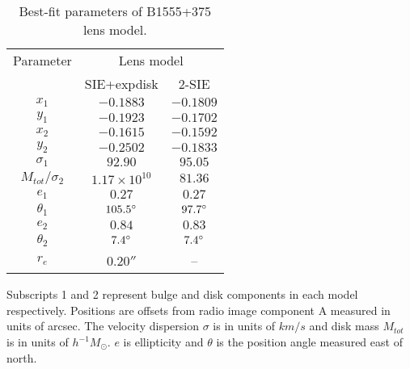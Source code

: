 \documentclass[useAMS,usenatbib]{mn2e}
\begin{document}
\begin{table}
  \caption{Best-fit parameters of B1555+375 lens model.}
  \begin{tabular}{@{}ccc}
\hline 
 Parameter  & \multicolumn{2}{c}{Lens model} \\
		&SIE+expdisk& 2-SIE		   
\\
\hline
$x_1$  	& $-0.1883$	& $-0.1809$	  \\
$y_1$	&$-0.1923$	&$-0.1702$	  \\
$x_2$	&$-0.1615$ 	&$-0.1592$	  \\
$y_2$	&$-0.2502$	& $-0.1833$	  \\
$\sigma_1$	&$92.90$ &	$95.05$	  \\
$M_{tot} / \sigma_2$& $1.17\times 10^{10} $  &$81.36$ 	 \\  
$e_1$	& $0.27$	& $0.27$ \\  
$\theta_1$	&$105.5 \hbox{$^\circ$}$ & $97.7 \hbox{$^\circ$}$	 \\
$e_2$	&$0.84$	&$0.83$      \\
$\theta_2$	&$7.4\hbox{$^\circ$}$ &$7.4\hbox{$^\circ$}$  \\
$r_e$	& $0.20 ''$ &  -- \\
\hline
\end{tabular}

\medskip
Subscripts 1 and 2 represent bulge and disk components in each model respectively. Positions are offsets from radio image component A measured in units of arcsec. The velocity dispersion $\sigma$ is in units of $km/s$ and disk mass $M_{tot}$ is in units of $h^{-1} M_{\odot}$. $e$ is ellipticity and $\theta$ is the position angle measured east of north.

\end{table}
\end{document}
